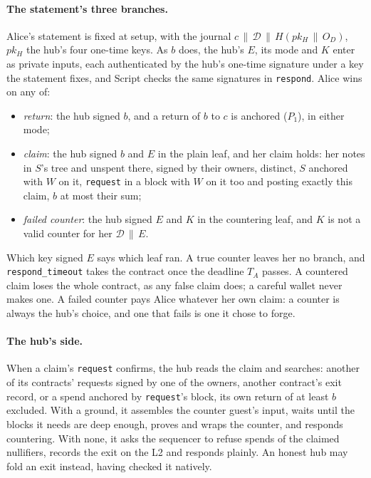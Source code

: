 \documentclass[11pt]{article}
\newcommand{\tx}[1]{\texttt{#1}}
\begin{document}
\paragraph{The statement's three branches.} Alice's statement is fixed
at setup, with the journal $c \,\|\, \mathcal{D} \,\|\, H(pk_H \,\|\, O_D)$,
$pk_H$ the hub's four one-time keys. As $b$ does, the hub's $E$, its
mode and $K$ enter as private inputs, each authenticated by the hub's
one-time signature under a key the statement fixes, and Script checks
the same signatures in \tx{respond}. Alice wins on any of:
\begin{itemize}[leftmargin=1.5em]
\item \emph{return}: the hub signed $b$, and a return of $b$ to $c$ is
  anchored ($P_1$), in either mode;
\item \emph{claim}: the hub signed $b$ and $E$ in the plain leaf, and her
  claim holds: her notes in $S$'s tree and unspent there, signed by
  their owners, distinct, $S$ anchored with $W$ on it, \tx{request} in a
  block with $W$ on it too and posting exactly this claim, $b$ at most
  their sum;
\item \emph{failed counter}: the hub signed $E$ and $K$ in the
  countering leaf, and $K$ is not a valid counter for her
  $\mathcal{D} \,\|\, E$.
\end{itemize}
Which key signed $E$ says which leaf ran. A true counter leaves her no
branch, and \tx{respond\_\allowbreak timeout} takes the contract once the deadline
$T_A$ passes. A countered claim loses the whole contract, as any false
claim does; a careful wallet never makes one. A failed counter pays
Alice whatever her own claim: a counter is always the hub's choice, and
one that fails is one it chose to forge.

\paragraph{The hub's side.} When a claim's \tx{request} confirms, the
hub reads the claim and searches: another of its contracts' requests
signed by one of the owners, another contract's exit record, or a spend
anchored by \tx{request}'s block, its own return of at least $b$
excluded. With a ground, it assembles the counter guest's input, waits
until the blocks it needs are deep enough, proves and wraps the counter,
and responds countering. With none, it asks the sequencer to refuse
spends of the claimed nullifiers, records the exit on the L2 and
responds plainly. An honest hub may fold an exit instead, having
checked it natively.
\end{document}
